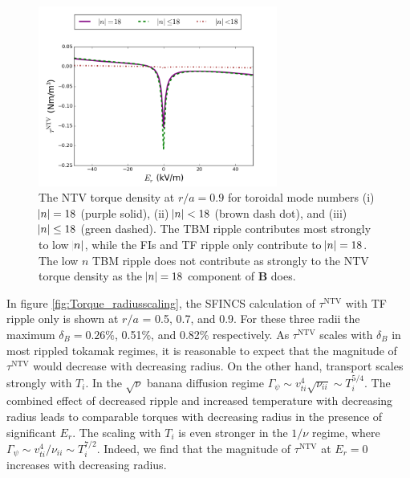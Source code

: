 \documentclass[aip, pop, preprint]{revtex4-1}
\numberwithin{figure}{section}
\numberwithin{equation}{section}
\begin{document}
\begin{figure}[h!]
\centering
\includegraphics[width=0.7\textwidth]{Torque_comparingTBMandFI.png}
\caption{\label{fig:Torque_comparingTBMandFI} The NTV torque density at $r/a = 0.9$ for toroidal mode numbers (i) $\abs{n} = 18$ (purple solid), (ii) $\abs{n} < 18$ (brown dash dot), and (iii) $\abs{n} \leq 18$ (green dashed). The TBM ripple contributes most strongly to low $\abs{n}$, while the FIs and TF ripple only contribute to $\abs{n} = 18$. The low $n$ TBM ripple does not contribute as strongly to the NTV torque density as the $\abs{n} = 18$ component of $\bm{B}$ does.}
\end{figure}

In figure \ref{fig:Torque_radiusscaling}, the SFINCS calculation of $\tau^{\text{NTV}}$ with TF ripple only is shown at $r/a$ = 0.5, 0.7, and 0.9. For these three radii the maximum $\delta_B = 0.26\%$,  0.51\%, and 0.82\% respectively. As $\tau^{\text{NTV}}$ scales with $\delta_B$ in most rippled tokamak regimes, it is reasonable to expect that the magnitude of $\tau^{\text{NTV}}$ would decrease with decreasing radius. On the other hand, transport scales strongly with $T_i$. In the $\sqrt{\nu}$ banana diffusion regime\cite{Shaing2008} $\Gamma_{\psi} \sim v_{ti}^4 \sqrt{\nu_{ii}} \sim T_i^{5/4}$. The combined effect of decreased ripple and increased temperature with decreasing radius leads to comparable torques with decreasing radius in the presence of significant $E_r$.  The scaling with $T_i$ is even stronger in the $1/\nu$ regime,\cite{Stringer1972, Shaing2003} where $\Gamma_{\psi} \sim v_{ti}^4/\nu_{ii} \sim T_i^{7/2}$. Indeed, we find that the magnitude of $\tau^{\text{NTV}}$ at $E_r = 0$ increases with decreasing radius.
 
\end{document}
